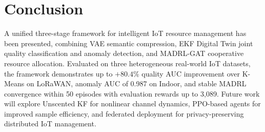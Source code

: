 \documentclass[conference]{IEEEtran}
\begin{document}
\section{Conclusion}
\label{sec:conclusion}

A unified three-stage framework for intelligent IoT resource management
has been presented, combining VAE semantic compression, EKF Digital Twin
joint quality classification and anomaly detection, and MADRL-GAT
cooperative resource allocation. Evaluated on three heterogeneous
real-world IoT datasets, the framework demonstrates up to $+80.4\%$
quality AUC improvement over K-Means on LoRaWAN, anomaly AUC of 0.987
on Indoor, and stable MADRL convergence within 50 episodes with evaluation
rewards up to 3,089. Future work will explore Unscented KF for nonlinear
channel dynamics, PPO-based agents for improved sample efficiency, and
federated deployment for privacy-preserving distributed IoT management.
\end{document}
